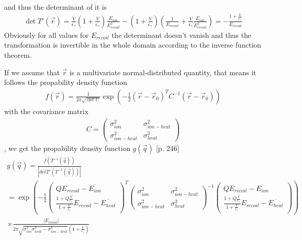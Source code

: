 and thus the determinant of it is
\begin{gather}
\det T'(\vec{r}) =  \frac{V}{\epsilon_\gamma} \left( 1 + \frac{V}{\epsilon_\gamma} \right) \frac{E_{ion}}{E_{recoil}^2} - \left(1 + \frac{V}{\epsilon_\gamma}\right) \left( \frac{1}{E_{recoil}} + \frac{V}{\epsilon_\gamma} \frac{E_{ion}}{E_{recoil}^2} \right) = - \frac{1 + \frac{V}{\epsilon_\gamma}}{E_{recoil}}
\end{gather}
Obviously for all values for $E_{recoil}$ the determinant doesn't vanish and thus the transformation is invertible in the whole domain according to the inverse function theorem.

If we assume that $\vec{r}$ is a multivariate normal-distributed quantity, that means it follows the propability density function
\begin{gather}
f(\vec{r}) = \frac{1}{2 \pi \sqrt{\det C}} \exp \left( - \frac{1}{2} (\vec{r} - \vec{r}_0)^T C^{-1} (\vec{r} - \vec{r}_0) \right) \label{multigaus}
\end{gather}
with the covariance matrix
\begin{gather}
C = \begin{pmatrix} \sigma_{ion}^2 & \sigma_{ion-heat}^2 \\ \sigma_{ion-heat}^2 & \sigma_{heat}^2 \end{pmatrix}
\end{gather}
, we get the propability density function $g(\vec{q})$ \cite{Henze}[p. 246]
\begin{gather}
g(\vec{q}) = \frac{f(T^{-1}(\vec{q}))}{\left| det T'(T^{-1}(\vec{q})) \right|} \\ =  \exp \left( - \frac{1}{2}  \begin{pmatrix} Q E_{recoil} - \overline{E_{ion}}\\ \frac{1 + Q \frac{V}{\epsilon_\gamma}}{1 + \frac{V}{\epsilon_\gamma}} E_{recoil} - \overline{E_{heat}} \end{pmatrix}^T \begin{pmatrix} \sigma_{ion}^2 & \sigma_{ion-heat}^2 \\ \sigma_{ion-heat}^2 & \sigma_{heat}^2 \end{pmatrix}^{-1} \begin{pmatrix} Q E_{recoil} - \overline{E_{ion}} \\ \frac{1 + Q \frac{V}{\epsilon_\gamma}}{1 + \frac{V}{\epsilon_\gamma}} E_{recoil} - \overline{E_{heat}} \end{pmatrix} \right) \\
\times  \frac{\left| E_{recoil} \right| }{2 \pi \sqrt{\sigma_{ion}^2 \sigma_{heat}^2 - \sigma_{ion-heat}^4} \left(1 + \frac{V}{\epsilon_\gamma}\right)} \label{propfunc}
\end{gather}